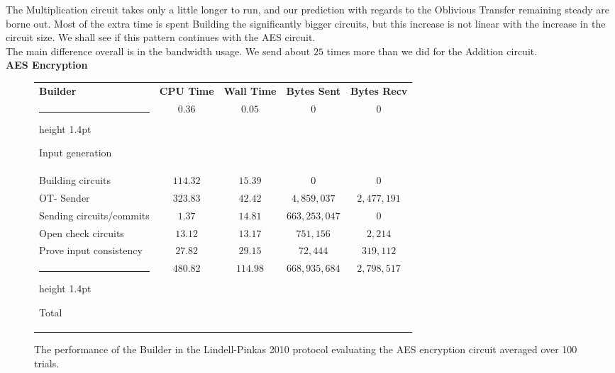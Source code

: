 \documentclass[11pt]{article} %
\makeatletter
\newcommand{\thickhline}{%
    \noalign {\ifnum 0=`}\fi \hrule height 1.4pt
    \futurelet \reserved@a \@xhline
}
\makeatother
\begin{document}
				The Multiplication circuit takes only a little longer to run, and our prediction with regards to the Oblivious Transfer remaining steady are borne out. Most of the extra time is spent Building the significantly bigger circuits, but this increase is not linear with the increase in the circuit size. We shall see if this pattern continues with the AES circuit.\\

				The main difference overall is in the bandwidth usage. We send about $25$ times more than we did for the Addition circuit.\\

				\pagebreak
				\FloatBarrier
				\noindent \textbf{AES Encryption}
				\begin{figure}[!ht]
					\begin{tabular}{| p{4.3cm} | c c c c |}
						\hline
						\textbf{Builder} & \textbf{CPU Time} & \textbf{Wall Time} & \textbf{Bytes Sent} & \textbf{Bytes Recv} \\
						\thickhline
						Input generation & $0.36$ & $0.05$ & $0$ & $0$ \\
						\hline
						Building circuits & $114.32$ & $15.39$ & $0$ & $0$ \\
						\hline
						OT- Sender & $323.83$ & $42.42$ & $4,859,037$ & $2,477,191$ \\
						\hline
						Sending circuits/commits & $1.37$ & $14.81$ & $663,253,047$ & $0$ \\
						\hline
						Open check circuits & $13.12$ & $13.17$ & $751,156$ & $2,214$ \\
						\hline
						Prove input consistency & $27.82$ & $29.15$ & $72,444$ & $319,112$ \\
						\thickhline
						Total & $480.82$ & $114.98$ & $668,935,684$ & $2,798,517$ \\
						\hline
					\end{tabular}
					\caption{The performance of the Builder in the Lindell-Pinkas 2010 protocol evaluating the AES encryption circuit averaged over 100 trials. \label{table:LP_2010_AES_Builder}}
				\end{figure}
\end{document}
